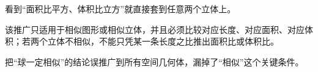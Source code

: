 \begin{trapbox}
\medskip
\begin{description}[style=nextline, leftmargin=2.8em, labelsep=0.5em, itemsep=0.35em]
    \item[\textbf{\textcolor{CTrap}{易错点五（相似体推广乱用）}}] 看到“面积比平方、体积比立方”就直接套到任意两个立体上。
    \item[\textbf{\textcolor{CTrap}{正确理解（必须相似）：}}] 该推广只适用于相似图形或相似立体，并且必须比较对应长度、对应面积、对应体积；若两个立体不相似，不能只凭某一条长度之比推出面积比或体积比。
    \item[\textbf{\textcolor{CTrap}{错因分析（忽略前提）：}}] 把“球一定相似”的结论误推广到所有空间几何体，漏掉了“相似”这个关键条件。
\end{description}
\end{trapbox}
